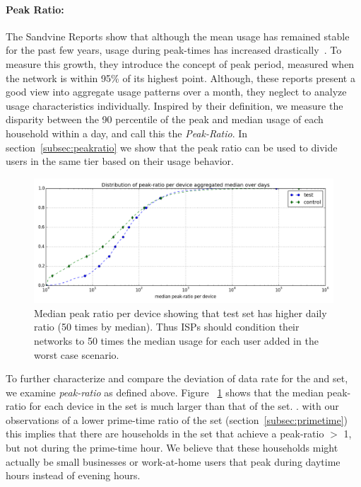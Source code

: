 \paragraph{Peak Ratio: }The Sandvine Reports show that although the mean usage has remained
stable for the past few years, usage during peak-times has increased
drastically~\cite{sandvine20141h}. To measure this growth, they introduce the
concept of peak period, measured when the network is within 95\% of its highest point.
Although, these reports present a good view into aggregate usage patterns over a month,
they neglect to analyze usage characteristics individually. Inspired by their
definition, we measure the disparity between the 90 percentile of the peak and median
usage of each household within a day, and call this the \emph{Peak-Ratio}. In
section~\ref{subsec:peakratio} we show that the peak ratio can be used
to divide users in the same tier based on their usage behavior.



\begin{figure}[ht]
\begin{minipage}{0.90\linewidth}
\centering
\includegraphics[width=1\linewidth]{figures/peakratio-CDF-devices-MEDIAN.png}
\caption{Median peak ratio per device showing that test set has higher daily ratio (50 times by median). Thus ISPs should condition their networks to 50 times the median usage for each user added in the worst case scenario.}
\label{fig:CDF-peak-ratio-median}
\end{minipage}
\end{figure}

To further characterize and compare the deviation of data rate for the \control and \test set, we examine \emph{peak-ratio} as defined above. 
Figure ~\ref{fig:CDF-peak-ratio-median} shows that the median peak-ratio for each device in the \test set is much larger than that of the \control set.
.
 with our observations of a lower prime-time ratio of the \test set (section~\ref{subsec:primetime}) this implies that there are households in the \test set that achieve a peak-ratio $>$ 1, but not during the prime-time hour. We believe that these households might actually be small businesses or work-at-home users that peak during daytime hours instead of evening hours.


